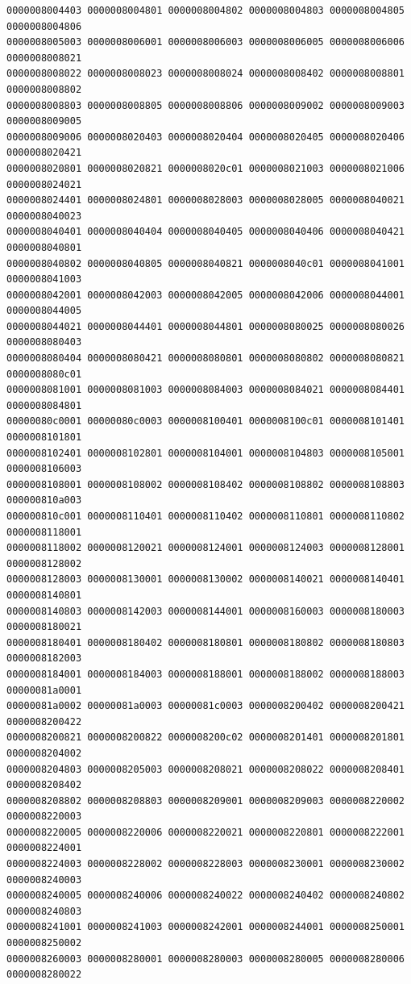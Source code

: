 \begin{Verbatim}[fontsize=\scriptsize]
0000008004403 0000008004801 0000008004802 0000008004803 0000008004805 0000008004806
0000008005003 0000008006001 0000008006003 0000008006005 0000008006006 0000008008021
0000008008022 0000008008023 0000008008024 0000008008402 0000008008801 0000008008802
0000008008803 0000008008805 0000008008806 0000008009002 0000008009003 0000008009005
0000008009006 0000008020403 0000008020404 0000008020405 0000008020406 0000008020421
0000008020801 0000008020821 0000008020c01 0000008021003 0000008021006 0000008024021
0000008024401 0000008024801 0000008028003 0000008028005 0000008040021 0000008040023
0000008040401 0000008040404 0000008040405 0000008040406 0000008040421 0000008040801
0000008040802 0000008040805 0000008040821 0000008040c01 0000008041001 0000008041003
0000008042001 0000008042003 0000008042005 0000008042006 0000008044001 0000008044005
0000008044021 0000008044401 0000008044801 0000008080025 0000008080026 0000008080403
0000008080404 0000008080421 0000008080801 0000008080802 0000008080821 0000008080c01
0000008081001 0000008081003 0000008084003 0000008084021 0000008084401 0000008084801
00000080c0001 00000080c0003 0000008100401 0000008100c01 0000008101401 0000008101801
0000008102401 0000008102801 0000008104001 0000008104803 0000008105001 0000008106003
0000008108001 0000008108002 0000008108402 0000008108802 0000008108803 000000810a003
000000810c001 0000008110401 0000008110402 0000008110801 0000008110802 0000008118001
0000008118002 0000008120021 0000008124001 0000008124003 0000008128001 0000008128002
0000008128003 0000008130001 0000008130002 0000008140021 0000008140401 0000008140801
0000008140803 0000008142003 0000008144001 0000008160003 0000008180003 0000008180021
0000008180401 0000008180402 0000008180801 0000008180802 0000008180803 0000008182003
0000008184001 0000008184003 0000008188001 0000008188002 0000008188003 00000081a0001
00000081a0002 00000081a0003 00000081c0003 0000008200402 0000008200421 0000008200422
0000008200821 0000008200822 0000008200c02 0000008201401 0000008201801 0000008204002
0000008204803 0000008205003 0000008208021 0000008208022 0000008208401 0000008208402
0000008208802 0000008208803 0000008209001 0000008209003 0000008220002 0000008220003
0000008220005 0000008220006 0000008220021 0000008220801 0000008222001 0000008224001
0000008224003 0000008228002 0000008228003 0000008230001 0000008230002 0000008240003
0000008240005 0000008240006 0000008240022 0000008240402 0000008240802 0000008240803
0000008241001 0000008241003 0000008242001 0000008244001 0000008250001 0000008250002
0000008260003 0000008280001 0000008280003 0000008280005 0000008280006 0000008280022

\end{Verbatim}
